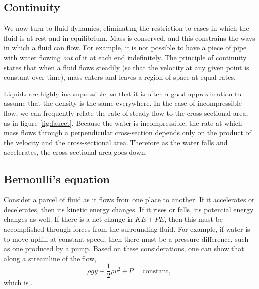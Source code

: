 \subsection{Continuity}

We now turn to fluid dynamics, eliminating the restriction to cases in which the fluid is
at rest and in equilibrium. Mass is conserved, and this constrains the ways in which a
fluid can flow. For example, it is not possible to have a piece of pipe with water flowing
\emph{out} of it at each end indefinitely. The principle of continuity states that when
a fluid flows steadily (so that the velocity at any given point is constant over time),
mass enters and leaves a region of space at equal rates. 


Liquids are highly incompressible,
so that it is often a good approximation to assume that the density is the same everywhere.
In the case of incompressible flow, we can frequently relate the rate of steady flow to
the cross-sectional area, as in figure \ref{fig:faucet}. Because the water is incompressible,
the rate at which mass flows through a perpendicular cross-section depends only on the
product of the velocity and the cross-sectional area. Therefore as the water falls and
accelerates, the cross-sectional area goes down.

\subsection{Bernoulli's equation}

Consider a parcel of fluid as it flows from one place to another. If it accelerates
or decelerates, then its kinetic energy changes. If it rises or falls, its potential
energy changes as well. If there is a net change in $KE+PE$, then this must be
accomplished through forces from the surrounding fluid. For example, if water is
to move uphill at constant speed, then there must be a pressure difference, such
as one produced by a pump. Based on these considerations, one can show that along
a streamline of the flow,
\begin{equation}
  \rho g y + \frac{1}{2}\rho v^2 + P = \text{constant},
\end{equation}
which is .
